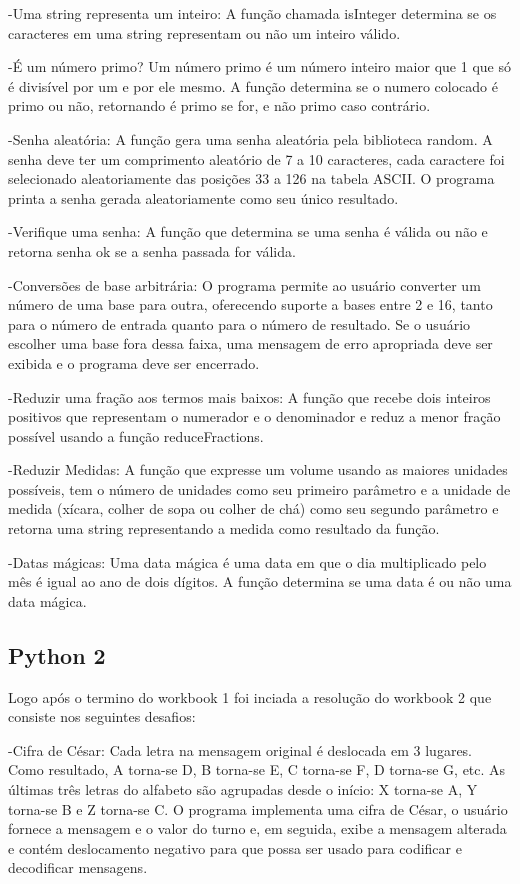 -Uma string representa um inteiro: A função chamada isInteger determina se os caracteres em uma string representam ou não um inteiro válido.

-É um número primo? Um número primo é um número inteiro maior que 1 que só é divisível por um e por ele mesmo. A função determina se o numero colocado é primo ou não, retornando é primo se for, e não primo caso contrário. 

-Senha aleatória: A função gera uma senha aleatória pela biblioteca random. A senha deve ter um comprimento aleatório de 7 a 10 caracteres, cada caractere foi selecionado aleatoriamente das posições 33 a 126 na tabela ASCII. O programa printa a senha gerada aleatoriamente como seu único resultado.

-Verifique uma senha: A função que determina se uma senha é válida ou não e retorna senha ok se a senha passada for válida.

-Conversões de base arbitrária: O programa permite ao usuário converter um número de uma base para outra, oferecendo suporte a bases entre 2 e 16, tanto para o número de entrada quanto para o número de resultado. Se o usuário escolher uma base fora dessa faixa, uma mensagem de erro apropriada deve ser exibida e o programa deve ser encerrado.

-Reduzir uma fração aos termos mais baixos: A função que recebe dois inteiros positivos que representam o numerador e o denominador e reduz a menor fração possível usando a função reduceFractions. 

-Reduzir Medidas: A função que expresse um volume usando as maiores unidades possíveis, tem o número de unidades como seu primeiro parâmetro e a unidade de medida (xícara, colher de sopa ou colher de chá) como seu segundo parâmetro e retorna uma string representando a medida como resultado da função. 

-Datas mágicas: Uma data mágica é uma data em que o dia multiplicado pelo mês é igual ao ano de dois dígitos. A função determina se uma data é ou não uma data mágica. 

\subsection{Python 2}

Logo após o termino do workbook 1 foi inciada a resolução do workbook 2 que consiste nos seguintes desafios:

-Cifra de César: Cada letra na mensagem original é deslocada em 3 lugares. Como resultado, A torna-se D, B torna-se E, C torna-se F, D torna-se G, etc. As últimas três letras do alfabeto são agrupadas desde o início: X torna-se A, Y torna-se B e Z torna-se C. 
O  programa implementa uma cifra de César, o usuário fornece a mensagem e o valor do turno e, em seguida, exibe a mensagem alterada e contém deslocamento negativo para que possa ser usado para codificar e decodificar mensagens.

